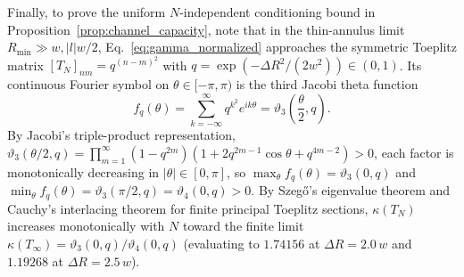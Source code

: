 \documentclass[aps,pra,reprint,nofootinbib,floatfix,longbibliography]{revtex4-2}
\theoremstyle{remark}
\newcommand{\abs}[1]{\lvert #1 \rvert}
\begin{document}
Finally, to prove the uniform $N$-independent conditioning bound in Proposition~\ref{prop:channel_capacity}, note that in the thin-annulus limit $R_{\min} \gg w, \abs{l}w/2$, Eq.~\eqref{eq:gamma_normalized} approaches the symmetric Toeplitz matrix $[T_N]_{nm} = q^{(n-m)^2}$ with $q = \exp(-\Delta R^2/(2w^2)) \in (0,1)$. Its continuous Fourier symbol on $\theta \in [-\pi,\pi)$ is the third Jacobi theta function
\begin{equation}
f_q(\theta) = \sum_{k=-\infty}^\infty q^{k^2} e^{ik\theta} = \vartheta_3\!\left(\frac{\theta}{2}, q\right).
\label{eq:app_jacobi_symbol}
\end{equation}
By Jacobi's triple-product representation, $\vartheta_3(\theta/2, q) = \prod_{m=1}^\infty (1 - q^{2m})(1 + 2q^{2m-1}\cos\theta + q^{4m-2}) > 0$, each factor is monotonically decreasing in $\abs{\theta} \in [0,\pi]$, so $\max_\theta f_q(\theta) = \vartheta_3(0,q)$ and $\min_\theta f_q(\theta) = \vartheta_3(\pi/2,q) = \vartheta_4(0,q) > 0$. By Szeg\H{o}'s eigenvalue theorem and Cauchy's interlacing theorem for finite principal Toeplitz sections, $\kappa(T_N)$ increases monotonically with $N$ toward the finite limit $\kappa(T_\infty) = \vartheta_3(0,q)/\vartheta_4(0,q)$ (evaluating to $1.74156$ at $\Delta R = 2.0\,w$ and $1.19268$ at $\Delta R = 2.5\,w$).


\end{document}
